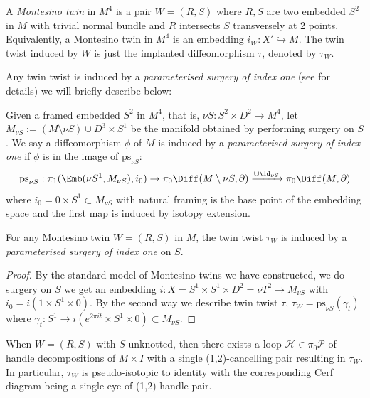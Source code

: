 \begin{definition}
   A \emph{Montesino twin} in $M^4$ is a pair $W=(R,S)$ where $R,S$ are two embedded $S^2$ in $M$ with trivial normal bundle and $R$ intersects $S$ transversely at 2 points. Equivalently, a Montesino twin in $M^4$ is an embedding $i_W: X'\hookrightarrow M$. The twin twist induced by $W$ is just the implanted diffeomorphism $\tau$, denoted by $\tau_W$. 
\end{definition}

Any twin twist is induced by a \emph{parameterised surgery of index one} (see \cite{kosanović2025diffeomorphisms4manifoldsgraspers} for details) we will briefly describe below:

\begin{definition} \label{def:parameterised-surgery}
    Given a framed embedded $S^2$ in $M^4$, that is, $\nu S: S^2\times D^2\to M^4$, let $M_{\nu S}:=(M\setminus \nu S) \cup D^3\times S^1$ be the manifold obtained by performing surgery on $S$. We say a diffeomorphism $\phi$ of $M$ is induced by a \emph{parameterised surgery of index one} if $\phi$ is in the image of $\text{ps}_{\nu S}$:
    $$\text{ps}_{\nu S}: \pi_1(\Emb(\nu S^1, M_{\nu S}), i_0)\to \pi_0\Diff(M\setminus \nu S, \partial)\xrightarrow{\cup \id_{\nu S}} \pi_0\Diff(M,\partial)$$
    where $i_0=0\times S^1\subset M_{\nu S}$ with natural framing is the base point of the embedding space and the first map is induced by isotopy extension.
\end{definition}

\begin{proposition}
    For any Montesino twin $W=(R,S)$ in $M$, the twin twist $\tau_W$ is induced by a \emph{parameterised surgery of index one} on $S$. 
\end{proposition}
\begin{proof}
    By the standard model of Montesino twins we have constructed, we do surgery on $S$ we get an embedding $i: X=S^1\times S^1\times D^2=\nu T^2\to M_{\nu S}$ with $i_0=i(1\times S^1\times 0)$. By the second way we describe twin twist $\tau$, $\tau_W=\text{ps}_{\nu S}(\gamma_t)$ where $\gamma_t: S^1\to i(e^{2\pi it}\times S^1\times 0)\subset M_{\nu S}$.
\end{proof}

\begin{proposition} \label{prop:twist-is-pseudo-isotopic-to-id}
    When $W=(R,S)$ with $S$ unknotted, then there exists a loop $\mathcal{H}\in \pi_0\mathcal{P}$ of handle decompositions of $M\times I$ with a single (1,2)-cancelling pair resulting in $\tau_W$. In particular, $\tau_W$ is pseudo-isotopic to identity with the corresponding Cerf diagram being a single eye of (1,2)-handle pair. 
\end{proposition}


